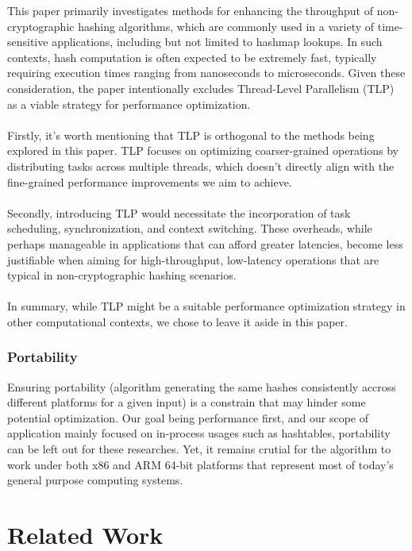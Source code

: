 \documentclass[10pt]{article}
\begin{document}
This paper primarily investigates methods for enhancing the throughput of non-cryptographic hashing algorithms, which are commonly used in a variety of time-sensitive applications, including but not limited to hashmap lookups.
In such contexts, hash computation is often expected to be extremely fast, typically requiring execution times ranging from nanoseconds to microseconds. Given these consideration, the paper intentionally excludes Thread-Level Parallelism
(TLP) as a viable strategy for performance optimization.\\\\
Firstly, it's worth mentioning that TLP is orthogonal to the methods being explored in this paper.
TLP focuses on optimizing coarser-grained operations by distributing tasks across multiple threads, which doesn't directly align with the fine-grained performance improvements we aim to achieve.\\\\
Secondly, introducing TLP would necessitate the incorporation of task scheduling, synchronization, and context switching.
These overheads, while perhaps manageable in applications that can afford greater latencies, become less justifiable when aiming for high-throughput, low-latency operations that are typical in non-cryptographic hashing scenarios.\\\\
In summary, while TLP might be a suitable performance optimization strategy in other computational contexts, we chose to leave it aside in this paper.

\subsubsection{Portability}

Ensuring portability (algorithm generating the same hashes consistently accross different platforms for a given input) is a constrain that may hinder some potential optimization. Our goal being performance first, and our scope of application mainly focused on in-process usages such as hashtables, portability can be left out for these researches. Yet, it remains crutial for the algorithm to work under both x86 and ARM 64-bit platforms that represent most of today's general purpose computing systems.

\clearpage
\section{Related Work}
\end{document}
